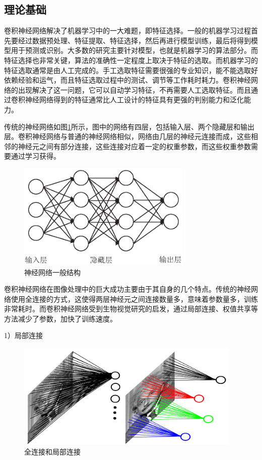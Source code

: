 \subsection{理论基础}
卷积神经网络解决了机器学习中的一大难题，即特征选择。一般的机器学习过程首先要经过数据预处理、特征提取、特征选择，然后再进行模型训练，最后将得到模型用于预测或识别。大多数的研究主要针对模型，也就是机器学习的算法部分。而特征选择也非常关键，算法的准确性一定程度上取决于特征的选取。而机器学习的特征选取通常是由人工完成的。手工选取特征需要很强的专业知识，能不能选取好依赖经验和运气，而且特征选取过程中的测试、调节等工作耗时耗力。卷积神经网络的出现解决了这一问题，它可以自动学习特征，不再需要人工选取特征。而且通过卷积神经网络得到的特征通常比人工设计的特征具有更强的判别能力和泛化能力。

传统的神经网络如图\ref{fig:24}所示，图中的网络有四层，包括输入层、两个隐藏层和输出层。卷积神经网络与普通的神经网络相似，网络由几层的神经元连接而成，这些相邻的神经元之间有部分连接，这些连接对应着一定的权重参数，而这些权重参数需要通过学习获得。
\begin{figure}[thb]
\centering
\includegraphics[height=2in]{./figures/2/2-4}
\caption{神经网络一般结构}
\label{fig:24}
\end{figure}

卷积神经网络在图像处理中的巨大成功主要由于其自身的几个特点。传统的神经网络使用全连接的方式，这使得两层神经元之间连接数量多，意味着参数量多，训练非常耗时。而卷积神经网络受到生物视觉研究的启发，通过局部连接、权值共享等方法减少了参数，加快了训练速度。

1）局部连接

\begin{figure}[thb]
\centering
\includegraphics[height=2in]{./figures/2/2-5}
\caption{全连接和局部连接}
\label{fig:25}
\end{figure}

